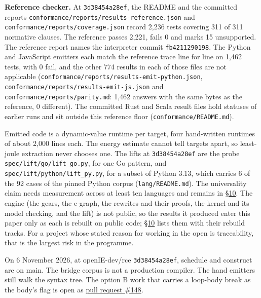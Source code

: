 \documentclass[10pt,letterpaper]{article}
\begin{document}
\textbf{Reference checker.} At \texttt{3d38454a28ef}, the README and the
committed reports \texttt{conformance/\allowbreak{}reports/\allowbreak{}results-\allowbreak{}reference.\allowbreak{}json}
and \texttt{conformance/\allowbreak{}reports/\allowbreak{}coverage.\allowbreak{}json} record 2,236 tests
covering 311 of 311 normative clauses. The reference passes 2,221, fails
0 and marks 15 unsupported. The reference report names the interpreter
commit \texttt{fb4211290198}. The Python and JavaScript emitters each
match the reference trace line for line on 1,462 tests, with 0 fail, and
the other 774 results in each of those files are not applicable
(\texttt{conformance/\allowbreak{}reports/\allowbreak{}results-\allowbreak{}emit-\allowbreak{}python.\allowbreak{}json},
\texttt{conformance/\allowbreak{}reports/\allowbreak{}results-\allowbreak{}emit-\allowbreak{}js.\allowbreak{}json} and
\texttt{conformance/\allowbreak{}reports/\allowbreak{}parity.\allowbreak{}md}: 1,462 answers with the same
bytes as the reference, 0 different). The committed Rust and Scala
result files hold statuses of earlier runs and sit outside this
reference floor (\texttt{conformance/\allowbreak{}README.\allowbreak{}md}).

Emitted code is a dynamic-value runtime per target, four hand-written
runtimes of about 2,000 lines each. The energy estimate cannot tell
targets apart, so least-joule extraction never chooses one. The lifts at
\texttt{3d38454a28ef} are the probe \texttt{spec/\allowbreak{}lift/\allowbreak{}go/\allowbreak{}lift\_\allowbreak{}go.\allowbreak{}py},
for one Go pattern, and \texttt{spec/\allowbreak{}lift/\allowbreak{}python/\allowbreak{}lift\_\allowbreak{}py.\allowbreak{}py}, for a
subset of Python 3.13, which carries 6 of the 92 cases of the pinned
Python corpus (\texttt{lang/README.md}). The universality claim needs
measurement across at least ten languages and remains in
\href{https://research.openie.dev/papers/rce/\#10-work-to-finish}{§10}.
The engine (the gears, the e-graph, the rewrites and their proofs, the
kernel and its model checking, and the lift) is not public, so the
results it produced enter this paper only as each is rebuilt on public
code;
\href{https://research.openie.dev/papers/rce/\#10-work-to-finish}{§10}
lists them with their rebuild tracks. For a project whose stated reason
for working in the open is traceability, that is the largest risk in the
programme.

On 6 November 2026, at openIE-dev/rce \texttt{3d38454a28ef}, schedule
and construct are on main. The bridge corpus is not a production
compiler. The hand emitters still walk the syntax tree. The option B
work that carries a loop-body break as the body's flag is open as
\href{https://github.com/openIE-dev/rce/pull/148}{pull request \#148}.
\end{document}
